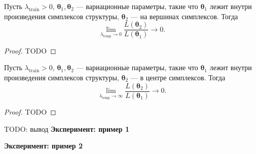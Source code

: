 \begin{theorem}
Пусть $\lambda_{\text{train}} >0$, $\boldsymbol{\theta}_1, \boldsymbol{\theta}_2$ --- вариационные параметры, такие что $\boldsymbol{\theta}_1$ лежит внутри произведения симплексов структуры, $\boldsymbol{\theta}_2$ --- на вершинах симплексов.
Тогда \[
\lim_{\lambda_\text{temp} \to 0} \frac{L(\boldsymbol{\theta}_2)}{L(\boldsymbol{\theta}_1)} \to 0.
\]
\end{theorem}
\begin{proof}
TODO
\end{proof}
\begin{theorem}
Пусть $\lambda_{\text{train}} >0$, $\boldsymbol{\theta}_1, \boldsymbol{\theta}_2$ --- вариационные параметры, такие что $\boldsymbol{\theta}_1$ лежит внутри произведения симплексов структуры, $\boldsymbol{\theta}_2$ --- в центре симплексов.
Тогда \[
\lim_{\lambda_\text{temp} \to \infty} \frac{L(\boldsymbol{\theta}_2)}{L(\boldsymbol{\theta}_1)} \to 0.
\]
\end{theorem}
\begin{proof}
TODO
\end{proof}
TODO: вывод
\textbf{Эксперимент: пример 1}

\textbf{Эксперимент: пример 2}







